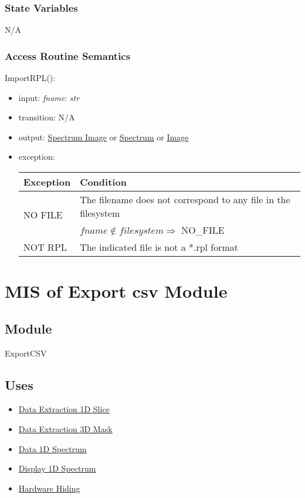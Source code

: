 \documentclass[12pt, titlepage]{article}
\begin{document}
\subsubsection{State Variables}
N/A

\subsubsection{Access Routine Semantics}

\noindent ImportRPL():
\begin{itemize}
    \item input: \textit{fname}: \textit{str}
    \item transition: N/A
    \item output: \hyperref[Mod:SI]{Spectrum Image} or
    \hyperref[Mod:Spectrum]{Spectrum} or \hyperref[Mod:Image]{Image}
    \item exception: 
    \begin{center}
        \begin{tabular}{p{3cm} p{12cm}}
            \toprule[0.15em]
            \textbf{Exception} & \textbf{Condition}\\
            \midrule[0.1em]
            \multirow{2}{0.25\textwidth}{NO FILE} & The filename does not
            correspond to any file in the filesystem\\ 
            & $fname \notin filesystem \Rightarrow$ NO\_FILE\\ 
            \midrule[0.05em]
            NOT RPL & The indicated file is not a *.rpl format\\
            \bottomrule[0.15em]
        \end{tabular}
    \end{center}
\end{itemize}

\section{MIS of Export csv Module} \label{Mod:ExportCSV}

\subsection{Module}

ExportCSV

\subsection{Uses}
\begin{itemize}
    \item \hyperref[Mod:Slice1D]{Data Extraction 1D Slice}
    \item \hyperref[Mod:Mask3D]{Data Extraction 3D Mask}
    \item \hyperref[Mod:Spectrum]{Data 1D Spectrum}
    \item \hyperref[Mod:Disp1D]{Display 1D Spectrum}
    \item \hyperref[Mod:HH]{Hardware Hiding}
\end{itemize}
\end{document}
